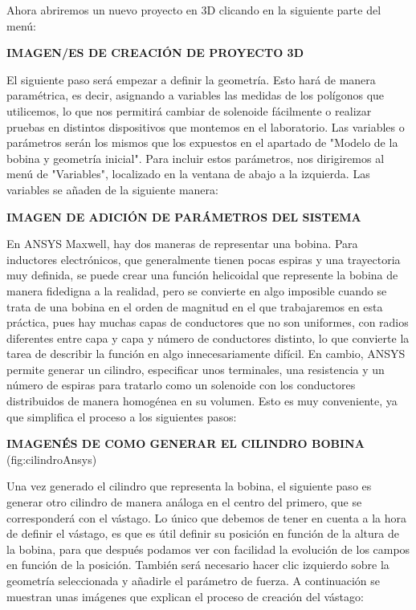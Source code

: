 Ahora abriremos un nuevo proyecto en 3D clicando en la siguiente parte del menú:

\textbf{IMAGEN/ES DE CREACIÓN DE PROYECTO 3D}

El siguiente paso será empezar a definir la geometría. Esto hará de manera paramétrica, es decir, asignando a variables las medidas de los polígonos que utilicemos, lo que nos permitirá cambiar de solenoide fácilmente o realizar pruebas en distintos dispositivos que montemos en el laboratorio. Las variables o parámetros serán los mismos que los expuestos en el apartado de "Modelo de la bobina y geometría inicial". Para incluir estos parámetros, nos dirigiremos al menú de "Variables", localizado en la ventana de abajo a la izquierda. Las variables se añaden de la siguiente manera:

\textbf{IMAGEN DE ADICIÓN DE PARÁMETROS DEL SISTEMA}

En ANSYS Maxwell, hay dos maneras de representar una bobina. Para inductores electrónicos, que generalmente tienen pocas espiras y una trayectoria muy definida, se puede crear una función helicoidal que represente la bobina de manera fidedigna a la realidad, pero se convierte en algo imposible cuando se trata de una bobina en el orden de magnitud en el que trabajaremos en esta práctica, pues hay muchas capas de conductores que no son uniformes, con radios diferentes entre capa y capa y número de conductores distinto, lo que convierte la tarea de describir la función en algo innecesariamente difícil. En cambio, ANSYS permite generar un cilindro, especificar unos terminales, una resistencia y un número de espiras para tratarlo como un solenoide con los conductores distribuidos de manera homogénea en su volumen. Esto es muy conveniente, ya que simplifica el proceso a los siguientes pasos:

\textbf{IMAGENÉS DE COMO GENERAR EL CILINDRO BOBINA} (fig:cilindroAnsys)

Una vez generado el cilindro que representa la bobina, el siguiente paso es generar otro cilindro de manera análoga en el centro del primero, que se corresponderá con el vástago. Lo único que debemos de tener en cuenta a la hora de definir el vástago, es que es útil definir su posición en función de la altura de la bobina, para que después podamos ver con facilidad la evolución de los campos en función de la posición. También será necesario hacer clic izquierdo sobre la geometría seleccionada y añadirle el parámetro de fuerza. A continuación se muestran unas imágenes que explican el proceso de creación del vástago:

